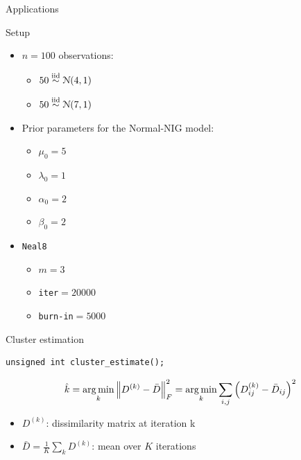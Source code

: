 \begin{frame}[c]
	\begin{center}
		\huge \color{blue} Applications
	\end{center}
\end{frame}

\begin{frame}[fragile]{Setup}
\begin{itemize}
\item $n=100$ observations:
	\begin{itemize}
	\item $50 \stackrel{\text{iid}}{\sim} \mathcal N(4,1)$
	\item $50 \stackrel{\text{iid}}{\sim} \mathcal N(7,1)$
	\end{itemize}
\item Prior parameters for the Normal-NIG model:
	\begin{itemize}
	\item $\mu_0 = 5$ 
	\item $\lambda_0 = 1$
	\item $\alpha_0 = 2$
	\item $\beta_0 = 2$
	\end{itemize}

\item \verb|Neal8|
	\begin{itemize}
	\item $m=3$ 
	\item \verb|iter|$=20000$
	\item \verb|burn-in|$=5000$
	\end{itemize}
\end{itemize}
\end{frame}

\begin{frame}[fragile]{Cluster estimation}


\begin{verbatim}
unsigned int cluster_estimate();
\end{verbatim}

$$ \hat{k} = \operatorname*{arg\,min}_k \left \lVert D^{(k)} - \bar D \right\rVert_F^2= \operatorname*{arg\,min}_k \sum_{i,j} \left( D^{(k)}_{ij} - \bar{D}_{ij}  \right)^2$$


\begin{itemize}

\item $D^{(k)}$: dissimilarity matrix  at iteration k \\

\item $\bar D= \frac{1}{K} \sum_k D^{(k)} $: mean over $K$ iterations
\end{itemize}

\end{frame}

